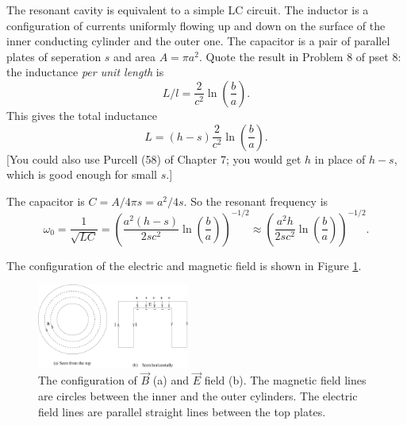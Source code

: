 \documentclass[makesolutionspdf]{esg8022pset}
\begin{document}
\begin{solution}
  The resonant cavity is equivalent to a simple LC circuit.  The
  inductor is a configuration of currents uniformly flowing up and down 
  on the surface of the inner conducting cylinder and the outer one.
  The capacitor is a pair of parallel plates of seperation $s$ and area
  $A=\pi a^2$.  Quote the result in Problem 8 of pset 8: the inductance
  {\sl per unit length} is 
  \[ L/l =\frac{2}{c^2}\ln{(\frac{b}{a})}.\]
  This gives the total inductance 
  \[ L= (h-s)\frac{2}{c^2}\ln{(\frac{b}{a})}.\]
  [You could also use Purcell (58) of Chapter 7; you would get $h$ in place of $h-s$, which is good enough 
  for small $s$.]

  The capacitor is $C= A/4\pi s= a^2/4s$.  So the resonant frequency is
  \begin{equation}
  \omega_0=\frac{1}{\sqrt{LC}}= \left(\frac{a^2
  (h-s)}{2sc^2}\ln(\frac{b}{a})\right)^{-1/2}
  \approx  \left(\frac{a^2
  h}{2sc^2}\ln(\frac{b}{a})\right)^{-1/2}.
  \end{equation}

  The configuration of the electric and magnetic field is shown in
  Figure \ref{fig:cavity2}.

  \begin{figure}[H]
    \centering
    \includegraphics[width = 5cm]{cavity2}
    \caption{The configuration of $\vec{B}$ (a) and $\vec{E}$ field (b).
      The magnetic field lines are circles between the inner and the outer
      cylinders.  The electric field lines are parallel straight lines
      between the top plates.}
    \label{fig:cavity2}
  \end{figure}


\end{solution}
\end{document}
